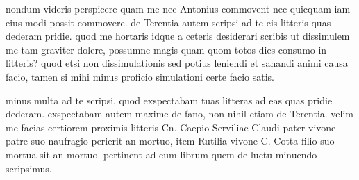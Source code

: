 


 nondum videris perspicere quam me nec Antonius commovent nec quicquam iam eius modi possit commovere. de Terentia autem scripsi ad te eis litteris quas dederam pridie. quod me hortaris idque a ceteris desiderari scribis ut dissimulem me tam graviter dolere, possumne magis quam quom totos dies consumo in litteris? quod etsi non dissimulationis sed potius leniendi et sanandi animi causa facio, tamen si mihi minus proficio simulationi certe facio satis.

 minus multa ad te scripsi, quod exspectabam tuas litteras ad eas quas pridie dederam. exspectabam autem maxime de fano, non nihil etiam de Terentia. velim me facias certiorem proximis litteris Cn. Caepio Serviliae Claudi pater vivone patre suo naufragio perierit an mortuo, item Rutilia vivone C. Cotta filio suo mortua sit an mortuo. pertinent ad eum librum quem de luctu minuendo scripsimus.
